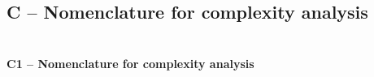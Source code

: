 \documentclass[11pt]{article}
\begin{document}
\section{}\label{section-28}

\section{}\label{section-29}

\subsection{C -- Nomenclature for complexity
analysis}\label{c-nomenclature-for-complexity-analysis}

\section{}\label{section-30}

\textbf{C1 -- Nomenclature for complexity analysis}

\section{}\label{section-31}
\end{document}
